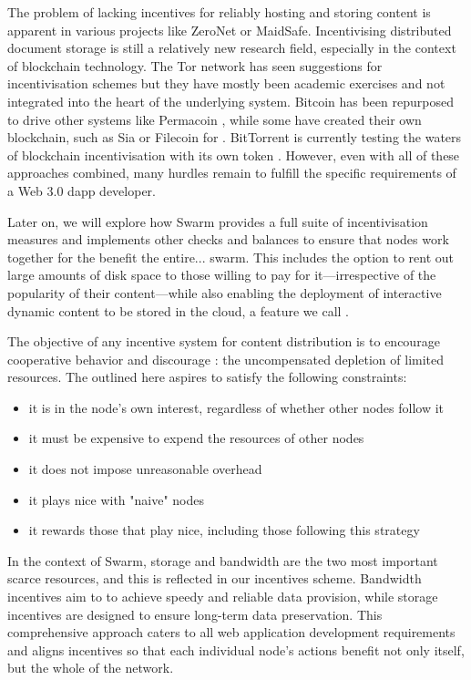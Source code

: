 The problem of lacking incentives for reliably hosting and storing content is apparent in various projects like ZeroNet or MaidSafe. Incentivising distributed document storage is still a relatively new research field, especially in the context of blockchain technology. The Tor network has seen suggestions for incentivisation schemes \cite{jansen2014onions,ghoshetal2014tor} but they have mostly been academic exercises and not integrated into the heart of the underlying system. Bitcoin has been repurposed to drive other systems like Permacoin \cite{miller2014permacoin}, while some have created their own blockchain, such as Sia \cite{vorick2014sia} or Filecoin \cite{filecoin2014} for . BitTorrent is currently testing the waters of blockchain incentivisation with its own token \cite{tron2018,bittorrent2019}. However, even with all of these approaches combined, many hurdles remain to fulfill the specific requirements of a Web 3.0 dapp developer.

Later on, we will explore how Swarm provides a full suite of incentivisation measures and implements other checks and balances to ensure that nodes work together for the benefit the entire... swarm. This includes the option to rent out large amounts of disk space to those willing to pay for it—irrespective of the popularity of their content—while also enabling the deployment of interactive dynamic content to be stored in the cloud, a feature we call .

The objective of any incentive system for  content distribution is to encourage cooperative behavior and discourage : the uncompensated depletion of limited resources. The  outlined here aspires to satisfy the following constraints:

\begin{itemize}
    \item it is in the node's own interest, regardless of whether other nodes follow it
    \item it must be expensive to expend the resources of other nodes
    \item it does not impose unreasonable overhead
    \item it plays nice with "naive" nodes
    \item it rewards those that play nice, including those following this strategy
\end{itemize}

In the context of Swarm, storage and bandwidth are the two most important scarce resources, and this is reflected in our incentives scheme. Bandwidth incentives aim to to achieve speedy and reliable data provision, while storage incentives are designed to ensure long-term data preservation. This comprehensive approach caters to all web application development requirements and aligns incentives so that each individual node's actions benefit not only itself, but the whole of the network. 

